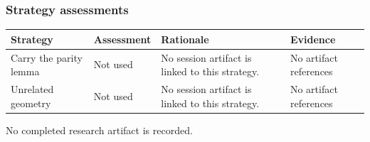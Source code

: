 \documentclass[11pt]{article}
\begin{document}
\subsubsection*{Strategy assessments}
\begin{longtable}{>{\raggedright\arraybackslash}p{.16\linewidth}>{\raggedright\arraybackslash}p{.15\linewidth}>{\raggedright\arraybackslash}p{.40\linewidth}>{\raggedright\arraybackslash}p{.17\linewidth}}
\toprule Strategy & Assessment & Rationale & Evidence \\
\midrule\endhead
Carry the parity lemma & Not used & No session artifact is linked to this strategy. & No artifact references \\
Unrelated geometry & Not used & No session artifact is linked to this strategy. & No artifact references \\
\bottomrule
\end{longtable}
No completed research artifact is recorded.\par
\end{document}
